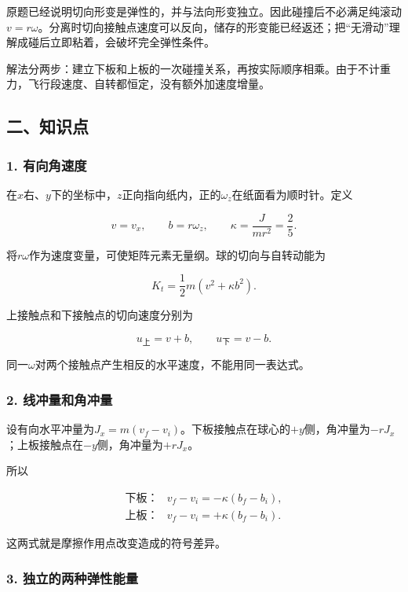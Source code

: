 \documentclass[12pt,a4paper,fontset=fandol]{ctexart}
\begin{document}
原题已经说明切向形变是弹性的，并与法向形变独立。因此碰撞后不必满足纯滚动\(v=r\omega\)。分离时切向接触点速度可以反向，储存的形变能已经返还；把``无滑动''理解成碰后立即粘着，会破坏完全弹性条件。

解法分两步：建立下板和上板的一次碰撞关系，再按实际顺序相乘。由于不计重力，飞行段速度、自转都恒定，没有额外加速度增量。

\subsection{二、知识点}\label{ux4e8cux77e5ux8bc6ux70b9-2}

\subsubsection{1. 有向角速度}\label{ux6709ux5411ux89d2ux901fux5ea6}

在\(x\)右、\(y\)下的坐标中，\(z\)正向指向纸内，正的\(\omega_z\)在纸面看为顺时针。定义

\[
v=v_x,\qquad b=r\omega_z,\qquad \kappa=\frac{J}{mr^2}=\frac25.
\]

将\(r\omega\)作为速度变量，可使矩阵元素无量纲。球的切向与自转动能为

\[
K_t=\frac12m(v^2+\kappa b^2).
\]

上接触点和下接触点的切向速度分别为

\[
u_{\text{上}}=v+b,\qquad u_{\text{下}}=v-b.
\]

同一\(\omega\)对两个接触点产生相反的水平速度，不能用同一表达式。

\subsubsection{2.
线冲量和角冲量}\label{ux7ebfux51b2ux91cfux548cux89d2ux51b2ux91cf}

设有向水平冲量为\(J_x=m(v_f-v_i)\)。下板接触点在球心的\(+y\)侧，角冲量为\(-rJ_x\)；上板接触点在\(-y\)侧，角冲量为\(+rJ_x\)。

所以

\[
\begin{array}{ll}
\text{下板：}&v_f-v_i=-\kappa(b_f-b_i),\\
\text{上板：}&v_f-v_i=+\kappa(b_f-b_i).
\end{array}
\]

这两式就是摩擦作用点改变造成的符号差异。

\subsubsection{3.
独立的两种弹性能量}\label{ux72ecux7acbux7684ux4e24ux79cdux5f39ux6027ux80fdux91cf}
\end{document}
